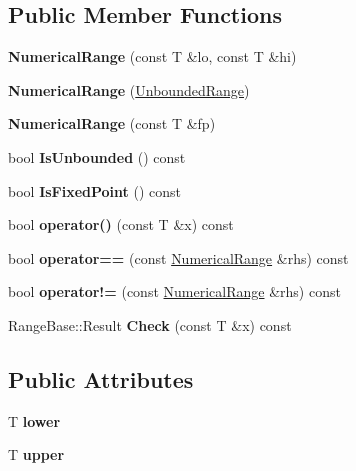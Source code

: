 \subsection*{Public Member Functions}
\begin{DoxyCompactItemize}
\item 
\mbox{\label{classNumericalRange_a08f1beb2fbae022150c172078bf04ff6}} 
{\bfseries Numerical\+Range} (const T \&lo, const T \&hi)
\item 
\mbox{\label{classNumericalRange_a836e8e8e2143145acee352af7e28c156}} 
{\bfseries Numerical\+Range} (\hyperlink{structUnboundedRange}{Unbounded\+Range})
\item 
\mbox{\label{classNumericalRange_a12b86dd2004fcb4496d6365f74c7214a}} 
{\bfseries Numerical\+Range} (const T \&fp)
\item 
\mbox{\label{classNumericalRange_a085db034212ff269606b4bb940e97096}} 
bool {\bfseries Is\+Unbounded} () const
\item 
\mbox{\label{classNumericalRange_ac430a224c1416ce496d89d7d418c9fe5}} 
bool {\bfseries Is\+Fixed\+Point} () const
\item 
\mbox{\label{classNumericalRange_a22a33cdde0e5c0237978aca52582feb8}} 
bool {\bfseries operator()} (const T \&x) const
\item 
\mbox{\label{classNumericalRange_ac847c294781d61bce0c6ae2fead7dca9}} 
bool {\bfseries operator==} (const \hyperlink{classNumericalRange}{Numerical\+Range} \&rhs) const
\item 
\mbox{\label{classNumericalRange_a102eee38c47e3ed2280d0e965b6c814d}} 
bool {\bfseries operator!=} (const \hyperlink{classNumericalRange}{Numerical\+Range} \&rhs) const
\item 
\mbox{\label{classNumericalRange_ab095e7124a8dc084442a65bea2a8231c}} 
Range\+Base\+::\+Result {\bfseries Check} (const T \&x) const
\end{DoxyCompactItemize}
\subsection*{Public Attributes}
\begin{DoxyCompactItemize}
\item 
\mbox{\label{classNumericalRange_a3b5e49117eaefab52b6679471ff9d169}} 
T {\bfseries lower}
\item 
\mbox{\label{classNumericalRange_afda256094bd5e85d08f25c9bdbd6cdf3}} 
T {\bfseries upper}
\end{DoxyCompactItemize}
